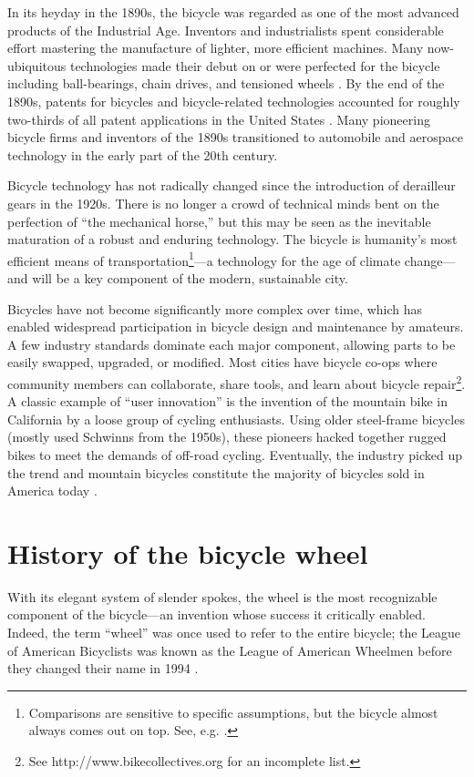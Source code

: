 \documentclass[../thesis.tex]{subfiles}
\begin{document}
In its heyday in the 1890s, the bicycle was regarded as one of the most advanced products of the Industrial Age. Inventors and industrialists spent considerable effort mastering the manufacture of lighter, more efficient machines. Many now-ubiquitous technologies made their debut on or were perfected for the bicycle including ball-bearings, chain drives, and tensioned wheels \cite{Herlihy2004}. By the end of the 1890s, patents for bicycles and bicycle-related technologies accounted for roughly two-thirds of all patent applications in the United States \cite{Pridmore1996}. Many pioneering bicycle firms and inventors of the 1890s transitioned to automobile and aerospace technology in the early part of the 20th century.

Bicycle technology has not radically changed since the introduction of derailleur gears in the 1920s. There is no longer a crowd of technical minds bent on the perfection of ``the mechanical horse,'' but this may be seen as the inevitable maturation of a robust and enduring technology. The bicycle is humanity's most efficient means of transportation\footnote{Comparisons are sensitive to specific assumptions, but the bicycle almost always comes out on top. See, e.g. \cite{Ghanta2010}.}---a technology for the age of climate change---and will be a key component of the modern, sustainable city.

Bicycles have not become significantly more complex over time, which has enabled widespread participation in bicycle design and maintenance by amateurs. A few industry standards dominate each major component, allowing parts to be easily swapped, upgraded, or modified. Most cities have bicycle co-ops where community members can collaborate, share tools, and learn about bicycle repair\footnote{See http://www.bikecollectives.org for an incomplete list.}. A classic example of ``user innovation'' is the invention of the mountain bike in California by a loose group of cycling enthusiasts. Using older steel-frame bicycles (mostly used Schwinns from the 1950s), these pioneers hacked together rugged bikes to meet the demands of off-road cycling. Eventually, the industry picked up the trend and mountain bicycles constitute the majority of bicycles sold in America today \cite{Crown1996}.


\section{History of the bicycle wheel}
With its elegant system of slender spokes, the wheel is the most recognizable component of the bicycle---an invention whose success it critically enabled. Indeed, the term ``wheel'' was once used to refer to the entire bicycle; the League of American Bicyclists was known as the League of American Wheelmen before they changed their name in 1994 \cite{Sturges}.
\end{document}
